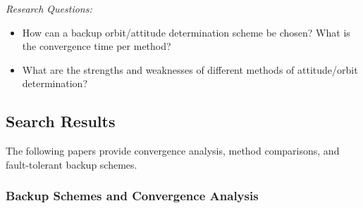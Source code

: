 \documentclass[11pt]{article}
\begin{document}
\textit{Research Questions:}
\begin{itemize}
    \item How can a backup orbit/attitude determination scheme be chosen? What is the convergence time per method?
    \item What are the strengths and weaknesses of different methods of attitude/orbit determination?
\end{itemize}

\subsection{Search Results}
The following papers provide convergence analysis, method comparisons, and fault-tolerant backup schemes.

\subsubsection{Backup Schemes and Convergence Analysis}
\end{document}
